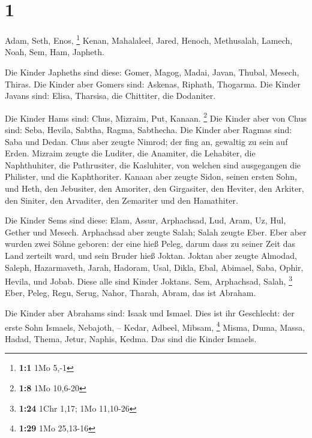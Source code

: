 \hypertarget{section}{%
\section{1}\label{section}}

 Adam, Seth, Enos, \footnote{\textbf{1:1} 1Mo 5,-1}
 Kenan, Mahalaleel, Jared,  Henoch, Methusalah,
Lamech,  Noah, Sem, Ham, Japheth.

 Die Kinder Japheths sind diese: Gomer, Magog, Madai, Javan,
Thubal, Mesech, Thiras.  Die Kinder aber Gomers sind:
Askenas, Riphath, Thogarma.  Die Kinder Javans sind: Elisa,
Tharsisa, die Chittiter, die Dodaniter.

 Die Kinder Hams sind: Chus, Mizraim, Put, Kanaan.
\footnote{\textbf{1:8} 1Mo 10,6-20}  Die Kinder aber von
Chus sind: Seba, Hevila, Sabtha, Ragma, Sabthecha. Die Kinder aber
Ragmas sind: Saba und Dedan.  Chus aber zeugte Nimrod; der
fing an, gewaltig zu sein auf Erden.  Mizraim zeugte die
Luditer, die Anamiter, die Lehabiter, die Naphthuhiter, 
die Pathrusiter, die Kasluhiter, von welchen sind ausgegangen die
Philister, und die Kaphthoriter.  Kanaan aber zeugte Sidon,
seinen ersten Sohn, und Heth,  den Jebusiter, den Amoriter,
den Girgasiter,  den Heviter, den Arkiter, den Siniter,
 den Arvaditer, den Zemariter und den Hamathiter.

 Die Kinder Sems sind diese: Elam, Assur, Arphachsad, Lud,
Aram, Uz, Hul, Gether und Mesech.  Arphachsad aber zeugte
Salah; Salah zeugte Eber.  Eber aber wurden zwei Söhne
geboren: der eine hieß Peleg, darum dass zu seiner Zeit das Land
zerteilt ward, und sein Bruder hieß Joktan.  Joktan aber
zeugte Almodad, Saleph, Hazarmaveth, Jarah,  Hadoram, Usal,
Dikla,  Ebal, Abimael, Saba,  Ophir, Hevila,
und Jobab. Diese alle sind Kinder Joktans.  Sem,
Arphachsad, Salah, \footnote{\textbf{1:24} 1Chr 1,17; 1Mo 11,10-26}
 Eber, Peleg, Regu,  Serug, Nahor, Tharah,
 Abram, das ist Abraham.

 Die Kinder aber Abrahams sind: Isaak und Ismael.
 Dies ist ihr Geschlecht: der erste Sohn Ismaels, Nebajoth,
-- Kedar, Adbeel, Mibsam, \footnote{\textbf{1:29} 1Mo 25,13-16}
 Misma, Duma, Massa, Hadad, Thema,  Jetur,
Naphis, Kedma. Das sind die Kinder Ismaels.

